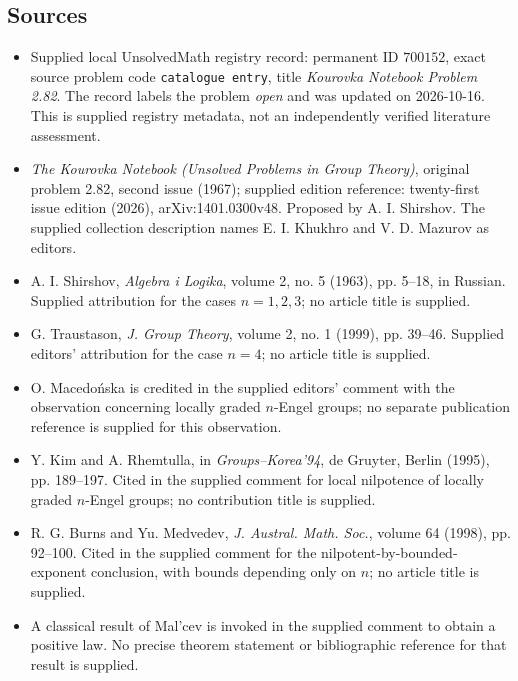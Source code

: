 \documentclass[11pt]{article}
\begin{document}
\subsection{Sources}
\begin{itemize}
\item Supplied local UnsolvedMath registry record: permanent ID \(700152\), exact source problem code \texttt{catalogue entry}, title \emph{Kourovka Notebook Problem 2.82}. The record labels the problem \emph{open} and was updated on 2026-10-16. This is supplied registry metadata, not an independently verified literature assessment.
\item \emph{The Kourovka Notebook (Unsolved Problems in Group Theory)}, original problem 2.82, second issue (1967); supplied edition reference: twenty-first issue edition (2026), arXiv:1401.0300v48. Proposed by A. I. Shirshov. The supplied collection description names E. I. Khukhro and V. D. Mazurov as editors.
\item A. I. Shirshov, \emph{Algebra i Logika}, volume 2, no. 5 (1963), pp. 5--18, in Russian. Supplied attribution for the cases \(n=1,2,3\); no article title is supplied.
\item G. Traustason, \emph{J. Group Theory}, volume 2, no. 1 (1999), pp. 39--46. Supplied editors' attribution for the case \(n=4\); no article title is supplied.
\item O. Macedo\'{n}ska is credited in the supplied editors' comment with the observation concerning locally graded \(n\)-Engel groups; no separate publication reference is supplied for this observation.
\item Y. Kim and A. Rhemtulla, in \emph{Groups--Korea'94}, de Gruyter, Berlin (1995), pp. 189--197. Cited in the supplied comment for local nilpotence of locally graded \(n\)-Engel groups; no contribution title is supplied.
\item R. G. Burns and Yu. Medvedev, \emph{J. Austral. Math. Soc.}, volume 64 (1998), pp. 92--100. Cited in the supplied comment for the nilpotent-by-bounded-exponent conclusion, with bounds depending only on \(n\); no article title is supplied.
\item A classical result of Mal'cev is invoked in the supplied comment to obtain a positive law. No precise theorem statement or bibliographic reference for that result is supplied.
\end{itemize}
\end{document}
